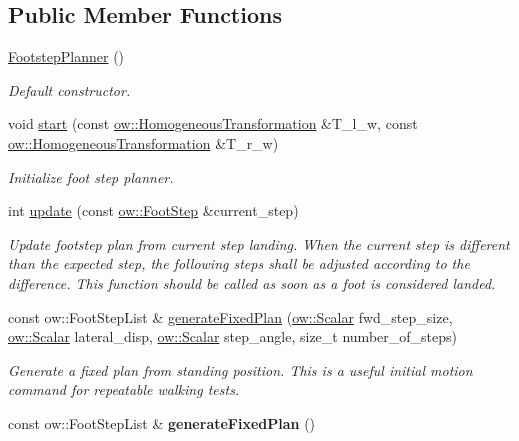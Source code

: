 \subsection*{Public Member Functions}
\begin{DoxyCompactItemize}
\item 
\hyperlink{classow__fs__planner_1_1FootstepPlanner_ab74711c202027c2d873d66f393a38a66}{Footstep\+Planner} ()
\begin{DoxyCompactList}\small\item\em Default constructor. \end{DoxyCompactList}\item 
void \hyperlink{classow__fs__planner_1_1FootstepPlanner_a67002bd419f4926f130709a6fb2dd9c0}{start} (const \hyperlink{classow__core_1_1HomogeneousTransformation}{ow\+::\+Homogeneous\+Transformation} \&T\+\_\+l\+\_\+w, const \hyperlink{classow__core_1_1HomogeneousTransformation}{ow\+::\+Homogeneous\+Transformation} \&T\+\_\+r\+\_\+w)
\begin{DoxyCompactList}\small\item\em Initialize foot step planner. \end{DoxyCompactList}\item 
int \hyperlink{classow__fs__planner_1_1FootstepPlanner_a4ce8ca44c468885d415a3e67bfe863df}{update} (const \hyperlink{classow__core_1_1FootStep}{ow\+::\+Foot\+Step} \&current\+\_\+step)
\begin{DoxyCompactList}\small\item\em Update footstep plan from current step landing. When the current step is different than the expected step, the following steps shall be adjusted according to the difference. This function should be called as soon as a foot is considered landed. \end{DoxyCompactList}\item 
const ow\+::\+Foot\+Step\+List \& \hyperlink{classow__fs__planner_1_1FootstepPlanner_a192132ce51f9728fd67908fb27f84f82}{generate\+Fixed\+Plan} (\hyperlink{types_8h_ac412879ee4a239c8032aa2d647f4a74a}{ow\+::\+Scalar} fwd\+\_\+step\+\_\+size, \hyperlink{types_8h_ac412879ee4a239c8032aa2d647f4a74a}{ow\+::\+Scalar} lateral\+\_\+disp, \hyperlink{types_8h_ac412879ee4a239c8032aa2d647f4a74a}{ow\+::\+Scalar} step\+\_\+angle, size\+\_\+t number\+\_\+of\+\_\+steps)
\begin{DoxyCompactList}\small\item\em Generate a fixed plan from standing position. This is a useful initial motion command for repeatable walking tests. \end{DoxyCompactList}\item 
const ow\+::\+Foot\+Step\+List \& {\bfseries generate\+Fixed\+Plan} ()\hypertarget{classow__fs__planner_1_1FootstepPlanner_afe59b387df90be76d866bbc7a584af50}{}\label{classow__fs__planner_1_1FootstepPlanner_afe59b387df90be76d866bbc7a584af50}


\end{DoxyCompactItemize}
